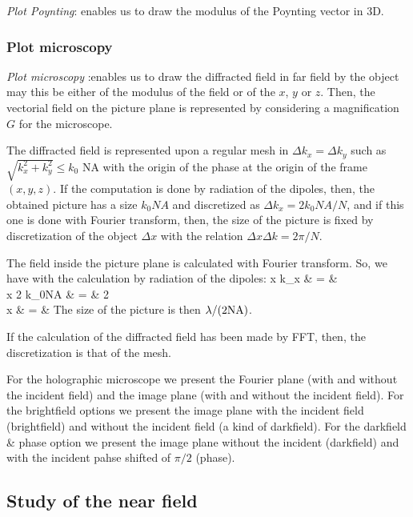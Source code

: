 {\it Plot Poynting}: enables us to draw the modulus of the Poynting
vector in 3D.

\subsubsection{Plot microscopy}

{\it Plot microscopy} :enables us to draw the diffracted field in far
field by the object may this be either of the modulus of the field or
of the $x$, $y$ or $z$. Then, the vectorial field on the picture plane
is represented by considering a magnification $G$ for the microscope.

The diffracted field is represented upon a regular mesh in
$\Delta k_x=\Delta k_y$ such as $\sqrt{k_x^2+k_y^2} \le k_0$ NA with
the origin of the phase at the origin of the frame $(x,y,z)$. If the
computation is done by radiation of the dipoles, then, the obtained
picture has a size $k_0 NA$ and discretized as
$\Delta k_x=2 k_0 NA/N$, and if this one is done with Fourier
transform, then, the size of the picture is fixed by discretization of
the object $\Delta x$ with the relation $\Delta x \Delta k=2\pi/N$.

The field inside the picture plane is calculated with Fourier
transform.  So, we have with the calculation by radiation of the
dipoles:
\be
\Delta x \Delta k_x & = &  \\
\Delta x 2 k_0{\rm NA} & = & 2\pi \\
\Delta x & = &  \ee
The size of the picture is then $\lambda/(2 {\rm NA})$.

If the calculation of the diffracted field has been made by FFT, then,
the discretization is that of the mesh.

For the holographic microscope we present the Fourier plane (with and
without the incident field) and the image plane (with and without the
incident field). For the brightfield options we present the image
plane with the incident field (brightfield) and without the incident
field (a kind of darkfield). For the darkfield \& phase option we
present the image plane without the incident (darkfield) and with the
incident pahse shifted of $\pi/2$ (phase).


\subsection{Study of the near field}

